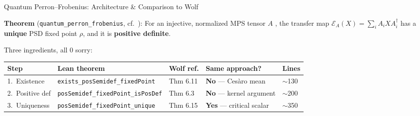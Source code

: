 \documentclass[aspectratio=169,10pt]{beamer}
\begin{document}
\begin{frame}{Quantum Perron--Frobenius: Architecture \& Comparison to Wolf}
    \vspace{-0.5em}

    \textbf{Theorem} (\texttt{quantum\_perron\_frobenius}, cf.\ \cite{Evans1978Spectral}):
    {\small For an injective, normalized MPS tensor $A$ \cite{Perez-Garcia2007Matrix},
    the transfer map
    $\mathcal{E}_A(X) = \sum_i A_i X A_i^\dagger$ has a \textbf{unique} PSD fixed
    point $\rho$, and it is \textbf{positive definite}.}

    \vspace{0.25em}
    {\small Three ingredients, all \textcolor{leangreen}{0 sorry}:}

    \vspace{0.1em}
    {\footnotesize
    \begin{tabular}{@{}lllll@{}}
        \toprule
        \textbf{Step} & \textbf{Lean theorem} & \textbf{Wolf ref.} & \textbf{Same approach?} & \textbf{Lines} \\
        \midrule
        \rowcolor{cardbg}
        1.\ Existence & \texttt{exists\_posSemidef\_fixedPoint} & {\cite{Wolf2012Quantum} Thm 6.11} &
            \textcolor{amber}{\textbf{No}} --- Ces\`aro mean & $\sim$130 \\
        2.\ Positive def & \texttt{posSemidef\_fixedPoint\_isPosDef} & {\cite{Wolf2012Quantum} Thm 6.3} &
            \textcolor{amber}{\textbf{No}} --- kernel argument & $\sim$200 \\
        \rowcolor{cardbg}
        3.\ Uniqueness & \texttt{posSemidef\_fixedPoint\_unique} & {\cite{Wolf2012Quantum} Thm 6.15} &
            \textcolor{leangreen}{\textbf{Yes}} --- critical scalar & $\sim$350 \\
        \bottomrule
    \end{tabular}
    }

    \vspace{0.3em}
    \begin{center}
    \end{center}
\end{frame}
\end{document}
